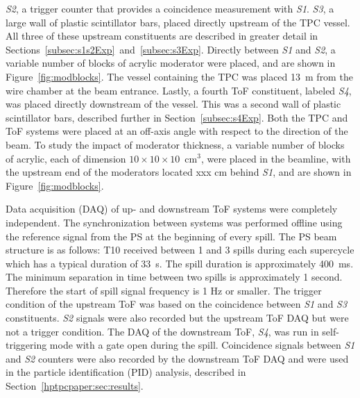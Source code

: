 \textit{S2}, a trigger counter that provides a coincidence measurement with \textit{S1}.
\textit{S3}, a large wall of plastic scintillator bars, placed directly upstream of the TPC vessel.
All three of these upstream constituents are described in greater detail in Sections~\ref{subsec:s1s2Exp}~and~\ref{subsec:s3Exp}.
Directly between \textit{S1} and \textit{S2}, a variable number of blocks of acrylic moderator were placed, and are shown in Figure~\ref{fig:modblocks}.
The vessel containing the TPC was placed 13~m from the wire chamber at the beam entrance.
Lastly, a fourth ToF constituent, labeled \textit{S4}, was placed directly downstream of the vessel.
This was a second wall of plastic scintillator bars, described further in Section~\ref{subsec:s4Exp}.
Both the TPC and ToF systems were placed at an off-axis angle with respect to the direction of the beam.
To study the impact of moderator thickness, a variable number of blocks of acrylic, each of dimension $10\times10\times10$~cm$^3$, were placed in the beamline, with the upstream end of the moderators located xxx cm behind \textit{S1}, and are shown in Figure~\ref{fig:modblocks}.


Data acquisition (DAQ) of up- and downstream ToF systems were completely independent.
The synchronization between systems was performed offline using the reference signal from the PS at the beginning of every spill.
The PS beam structure is as follows: T10 received between 1 and 3 spills during each supercycle which has a typical duration of 33~s.
The spill duration is approximately 400~ms.
The minimum separation in time between two spills is approximately 1 second.
Therefore the start of spill signal frequency is 1 Hz or smaller.
The trigger condition of the upstream ToF was based on the coincidence between \textit{S1} and \textit{S3} constituents.
\textit{S2} signals were also recorded but the upstream ToF DAQ but were not a trigger condition.
The DAQ of the downstream ToF, \textit{S4}, was run in self-triggering mode with a gate open during the spill.
Coincidence signals between \textit{S1} and \textit{S2} counters were also recorded by the downstream ToF DAQ and were used in the particle identification (PID) analysis, described in Section~\ref{hptpcpaper:sec:results}.  

